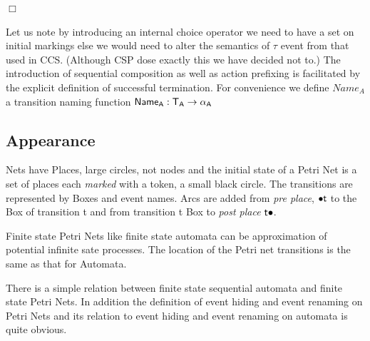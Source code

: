 \documentclass[]{article}
\begin{document}
$\Box$

Let us note by introducing an internal choice operator we need to have a set on initial markings else we would need to alter the semantics of $\tau$ event from that used in CCS. (Although CSP dose exactly this we have decided not to.) The introduction of  sequential composition as well as action prefixing is facilitated by the explicit definition of successful termination.  
For convenience  we define $Name_A$ a transition naming function $\sf Name_A:T_A\rightarrow \alpha_A$

 \subsection{Appearance}
 Nets have  Places, large circles,  not nodes and the initial state of a Petri Net is a set of places each  \emph{marked} with a  token, a small black circle. The transitions are represented by Boxes and event names. Arcs are added from \emph{pre place}, ${\sf\bullet t}$ to the Box of transition {\sf t}  and from transition {\sf t} Box  to \emph{post place} ${\sf t\bullet}$.

Finite state Petri Nets  like finite state automata can be  approximation of potential infinite sate processes. The location of the Petri net transitions is the same as that for Automata.

There is a simple relation between finite state sequential automata and finite state Petri Nets. In addition the definition of event hiding and event renaming   on Petri Nets and its relation to event hiding and event renaming   on  automata is quite obvious.
\end{document}
